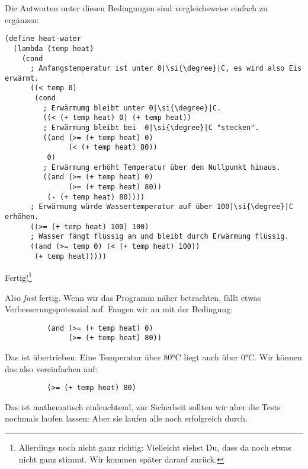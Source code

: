 %
Die Antworten unter diesen Bedingungen sind vergleichsweise einfach zu
ergänzen:
%
\begin{lstlisting}
(define heat-water
  (lambda (temp heat)
    (cond
      ; Anfangstemperatur ist unter 0|\si{\degree}|C, es wird also Eis erwärmt.
      ((< temp 0)
       (cond
         ; Erwärmumg bleibt unter 0|\si{\degree}|C.
         ((< (+ temp heat) 0) (+ temp heat))
         ; Erwärmung bleibt bei  0|\si{\degree}|C "stecken".
         ((and (>= (+ temp heat) 0)
               (< (+ temp heat) 80))
          0)
         ; Erwärmung erhöht Temperatur über den Nullpunkt hinaus.
         ((and (>= (+ temp heat) 0)
               (>= (+ temp heat) 80))
          (- (+ temp heat) 80))))
      ; Erwärmung würde Wassertemperatur auf über 100|\si{\degree}|C erhöhen.
      ((>= (+ temp heat) 100) 100)
      ; Wasser fängt flüssig an und bleibt durch Erwärmung flüssig.
      ((and (>= temp 0) (< (+ temp heat) 100))
       (+ temp heat)))))
\end{lstlisting}
%
Fertig!\footnote{Allerdings noch nicht ganz richtig: Vielleicht siehst Du,
  dass da noch etwas nicht ganz stimmt.  Wir kommen später darauf zurück.}

\medskip

Also \emph{fast} fertig.  Wenn wir das Programm näher betrachten,
fällt etwas Verbesserungspotenzial auf.  Fangen wir an mit der
Bedingung:
%
\begin{lstlisting}
          (and (>= (+ temp heat) 0)
               (>= (+ temp heat) 80))
\end{lstlisting}
%
Das ist übertrieben: Eine Temperatur über 80\si{\degree}C liegt auch über 0\si{\degree}C.
Wir können das also vereinfachen auf:
%
\begin{lstlisting}
          (>= (+ temp heat) 80)
\end{lstlisting}
%
Das ist mathematisch einleuchtend, zur Sicherheit sollten wir aber die
Tests nochmals laufen lassen: Aber sie laufen alle noch erfolgreich
durch.

